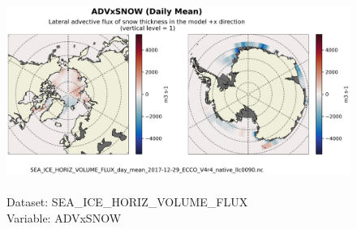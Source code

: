 \begin{figure}[H]
\centering
\includegraphics[scale=0.5]{../images/plots/native_plots/Sea-Ice_and_Snow_Horizontal_Volume_Fluxes/ADVxSNOW.png}
\caption{\\Dataset: SEA\_ICE\_HORIZ\_VOLUME\_FLUX\\Variable: ADVxSNOW}
\label{tab:table-SEA_ICE_HORIZ_VOLUME_FLUX_ADVxSNOW-Plot}
\end{figure}
\pagebreak
